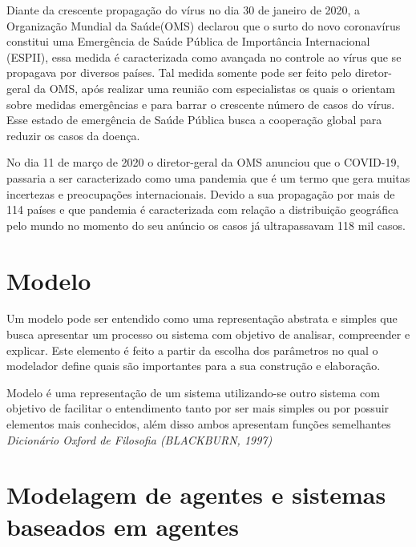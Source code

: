 Diante da crescente propagação do vírus no dia 30 de janeiro de 2020, a Organização Mundial da Saúde(OMS) declarou que o surto do novo coronavírus constitui uma Emergência de Saúde Pública de Importância Internacional (ESPII), essa medida é caracterizada como avançada no controle ao vírus que se propagava por diversos países. Tal medida somente pode ser feito pelo diretor-geral da OMS, após realizar uma reunião com especialistas os quais o orientam sobre medidas emergências e para barrar o crescente número de casos do vírus. Esse estado de emergência de Saúde Pública busca a cooperação global para reduzir os casos da doença.

No dia 11 de março de 2020 o diretor-geral da OMS anunciou que o COVID-19, passaria a ser caracterizado como uma pandemia que é um termo que gera muitas incertezas e preocupações internacionais. Devido a sua propagação por mais de 114 países e que pandemia é caracterizada com relação a distribuição geográfica pelo mundo  no momento do seu anúncio os casos já ultrapassavam 118 mil casos.

\section{Modelo}

Um modelo pode ser entendido como uma representação abstrata e simples que busca apresentar um processo ou sistema com objetivo de analisar, compreender e explicar. Este elemento é feito a partir da escolha dos parâmetros no qual o modelador define quais são importantes para a sua construção e elaboração.

Modelo é uma representação de um sistema utilizando-se outro sistema com objetivo de facilitar o entendimento tanto por ser mais simples ou por possuir elementos mais conhecidos, além disso ambos apresentam funções semelhantes \textit{Dicionário Oxford de Filosofia (BLACKBURN, 1997)}


\section{Modelagem de agentes e sistemas baseados em agentes}






